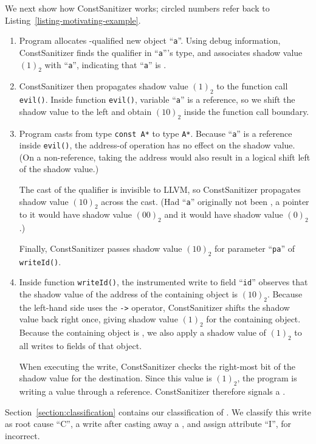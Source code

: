 We next show how ConstSanitizer works; circled numbers refer back to
Listing~\ref{listing-motivating-example}.

\begin{enumerate}[label=\protect\circled{\arabic*}]
  \item Program allocates \const{}-qualified new object ``\texttt{a}''.
        Using debug information, ConstSanitizer finds the \const{} qualifier in
        ``\texttt{a}''{}'s type, and associates shadow value $(1)_2$ with
        ``\texttt{a}'', indicating that ``\texttt{a}'' is \const{}.
  \item ConstSanitizer then propagates shadow value $(1)_2$ to the function call
        \texttt{evil()}.
        Inside function \texttt{evil()}, variable ``\texttt{a}'' is a reference,
        so we shift the shadow value to the left and obtain $(10)_2$ inside the
        function call boundary.
  \item Program casts from type \texttt{const A*} to type \texttt{A*}.
        Because ``\texttt{a}'' is a reference inside \texttt{evil()}, the
        address-of operation has no effect on the shadow value.
        (On a non-reference, taking the address would also result in a logical
        shift left of the shadow value.)

        The cast of the \const{} qualifier is invisible to LLVM, so
        ConstSanitizer propagates shadow value $(10)_2$ across the cast.
        (Had ``\texttt{a}'' originally not been \const{}, a pointer to it would
        have shadow value $(00)_2$ and it would have shadow value $(0)_2$.)

        Finally, ConstSanitizer passes shadow value $(10)_2$ for parameter
        ``\texttt{pa}'' of \texttt{writeId()}.
  \item Inside function \texttt{writeId()}, the instrumented write to field
        ``\texttt{id}'' observes that the shadow value of the address of the
        containing object is $(10)_2$.
        Because the left-hand side uses the \verb+->+ operator, ConstSanitizer
        shifts the shadow value back right once, giving shadow value $(1)_2$ for
        the containing object.
        Because the containing object is \const{}, we also apply a shadow value
        of $(1)_2$ to all writes to fields of that object.

        When executing the write, ConstSanitizer checks the right-most bit of
        the shadow value for the destination.
        Since this value is $(1)_2$, the program is writing a value through a
        \const{} reference.
        ConstSanitizer therefore signals a \wtc{}.
\end{enumerate}

\noindent Section~\ref{section:classification} contains our classification of \wstc{}.
We classify this write as root cause ``C'', a write after casting
away a \const{}, and assign attribute ``I'', for incorrect.
